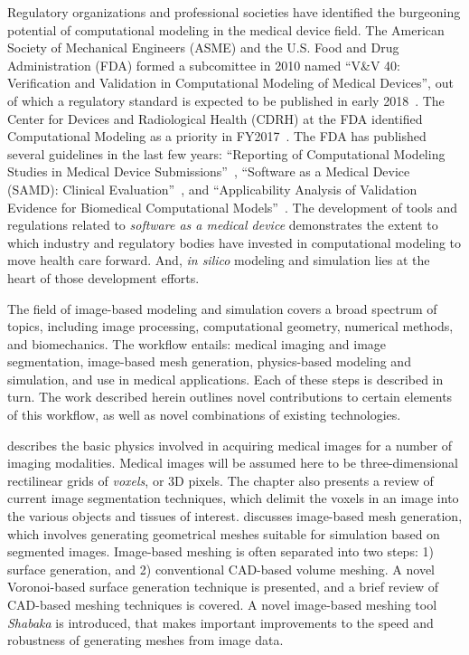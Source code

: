 Regulatory organizations and professional societies have identified the burgeoning potential of computational modeling in the medical device field. The American Society of Mechanical Engineers (ASME) and the U.S. Food and Drug Administration (FDA) formed a subcomittee in 2010 named ``V\&V 40: Verification and Validation in Computational Modeling of Medical Devices'', out of which a regulatory standard is expected to be published in early 2018~\cite{committee}. The Center for Devices and Radiological Health (CDRH) at the FDA identified Computational Modeling as a priority in FY2017~\cite{Morrison2017}. The FDA has published several guidelines in the last few years: ``Reporting of Computational Modeling Studies in Medical Device Submissions''~\cite{fda1_2016}, ``Software as a Medical Device (SAMD): Clinical Evaluation''~\cite{fda1_2016}, and ``Applicability Analysis of Validation Evidence for Biomedical Computational Models''~\cite{pathmanathan_2017}. The development of tools and regulations related to \textit{software as a medical device} demonstrates the extent to which industry and regulatory bodies have invested in computational modeling to move health care forward. And, \textit{in silico} modeling and simulation lies at the heart of those development efforts.


The field of image-based modeling and simulation covers a broad spectrum of topics, including image processing, computational geometry, numerical methods, and biomechanics. The workflow entails: medical imaging and image segmentation, image-based mesh generation, physics-based modeling and simulation, and use in medical applications. Each of these steps is described in turn. The work described herein outlines novel contributions to certain elements of this workflow, as well as novel combinations of existing technologies.

 describes the basic physics involved in acquiring medical images for a number of imaging modalities. Medical images will be assumed here to be three-dimensional rectilinear grids of \textit{voxels}, or 3D pixels. The chapter also presents a review of current image segmentation techniques, which delimit the voxels in an image into the various objects and tissues of interest.  discusses image-based mesh generation, which involves generating geometrical meshes suitable for simulation based on segmented images. Image-based meshing is often separated into two steps: 1) surface generation,  and 2) conventional CAD-based volume meshing. A novel Voronoi-based surface generation technique is presented, and a brief review of CAD-based meshing techniques is covered. A novel image-based meshing tool \textit{Shabaka} is introduced, that makes important improvements to the speed and robustness of generating meshes from image data.

